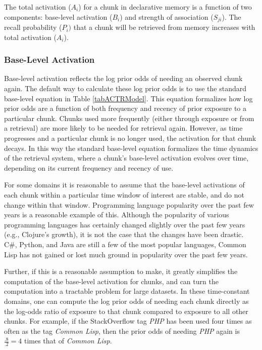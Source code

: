 \documentclass[man,floatsintext,donotrepeattitle]{apa6}
\begin{document}
The total activation ($A_{i}$) for a chunk in declarative memory is a function of two components: base-level activation ($B_{i}$) and strength of association ($S_{ji}$).
The recall probability ($P_{i})$ that a chunk will be retrieved from memory increases with total activation ($A_{i}$).

\subsubsection{Base-Level Activation}

Base-level activation reflects the log prior odds of needing an observed chunk again.
The default way to calculate these log prior odds is to use the standard base-level equation in Table \ref{tabACTRModel}.
This equation formalizes how log prior odds are a function of both frequency and recency of prior exposure to a particular chunk.
Chunks used more frequently (either through exposure or from a retrieval) are more likely to be needed for retrieval again.
However, as time progresses and a particular chunk is no longer used, the activation for that chunk decays.
In this way the standard base-level equation formalizes the time dynamics of the retrieval system, where a chunk's base-level activation evolves over time, depending on its current frequency and recency of use.

For some domains it is reasonable to assume that the base-level activations of each chunk within a particular time window of interest are stable, and do not change within that window.
Programming language popularity over the past few years is a reasonable example of this.
Although the popularity of various programming languages has certainly changed slightly over the past few years (e.g., Clojure's growth), it is not the case that the changes have been drastic.
C\#, Python, and Java are still a few of the most popular languages, Common Lisp has not gained or lost much ground in popularity over the past few years.

Further, if this is a reasonable assumption to make, it greatly simplifies the computation of the base-level activation for chunks, and can turn the computation into a tractable problem for large datasets.
In these time-constant domains, one can compute the log prior odds of needing each chunk directly as the log-odds ratio of exposure to that chunk compared to exposure to all other chunks.
For example, if the StackOverflow tag \emph{PHP} has been used four times as often as the tag \emph{Common Lisp}, then the prior odds of needing \emph{PHP} again is $\frac{.8}{.2}=4$ times that of \emph{Common Lisp}.
\end{document}
